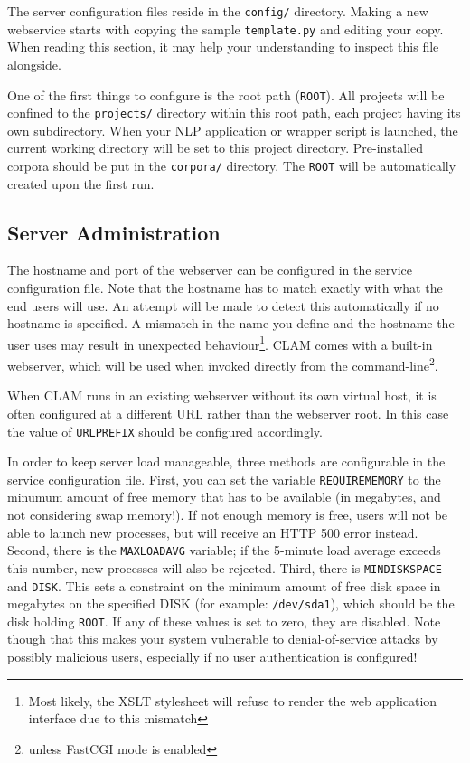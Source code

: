 \documentclass[a4paper,12pt]{report}
\begin{document}
The server configuration files reside in the \texttt{config/} directory. Making
a new webservice starts with copying the sample \texttt{template.py} and
editing your copy. When reading this section, it may help your understanding to
inspect this file alongside.

One of the first things to configure is the root path (\texttt{ROOT}). All
projects will be confined to the \texttt{projects/} directory within this root
path, each project having its own subdirectory. When your NLP application or
wrapper script is launched, the current working directory will be set to this
project directory. Pre-installed corpora should be put in the \texttt{corpora/}
directory. The \texttt{ROOT} will be automatically created upon the first run.


\subsection{Server Administration}
\label{sec:sadmin}

The hostname and port of the webserver can be configured in the service
configuration file. Note that the hostname has to match exactly with what the
end users will use. An attempt will be made to detect this automatically if no
hostname is specified. A mismatch in the name you define and the hostname the
user uses may result in unexpected behaviour\footnote{Most likely, the XSLT
stylesheet will refuse to render the web application interface due to this
mismatch}. CLAM comes with a built-in webserver, which will be used when
invoked directly from the command-line\footnote{unless FastCGI mode is
enabled}.

When CLAM runs in an existing webserver without its own virtual host, it is
often configured at a different URL rather than the webserver root. In this
case the value of \texttt{URLPREFIX} should be configured accordingly.

In order to keep server load manageable, three methods are configurable in the
service configuration file. First, you can set the variable
\texttt{REQUIREMEMORY} to the minumum amount of free memory that has to be
available (in megabytes, and not considering swap memory!). If not enough
memory is free, users will not be able to launch new processes, but will
receive an HTTP 500 error instead. Second, there is the \texttt{MAXLOADAVG}
variable; if the 5-minute load average exceeds this number, new processes will
also be rejected. Third, there is \texttt{MINDISKSPACE} and \texttt{DISK}. This
sets a constraint on the minimum amount of free disk space in megabytes on the
specified DISK (for example: \texttt{/dev/sda1}), which should be the disk
holding \texttt{ROOT}. If any of these values is set to zero, they are
disabled. Note though that this makes your system vulnerable to
denial-of-service attacks by possibly malicious users, especially if no user
authentication is configured!
\end{document}
